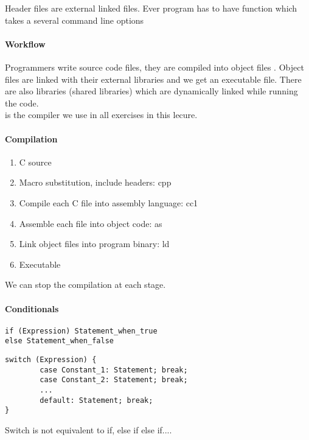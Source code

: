
Header files are external linked files. Ever program has to have  function which takes a several command line options 

\paragraph{Workflow}
Programmers write source code  files, they are compiled into object files . Object files are linked with their external libraries  and we get an executable file. There are also libraries (shared libraries) which are dynamically linked  while running the code.\\
 is the compiler we use in all exercises in this lecure.

\paragraph{Compilation}

\begin{enumerate}
    \item C source 
    \item Macro substitution, include headers: cpp 
    \item Compile each C file into assembly language: cc1 
    \item Assemble each file into object code: as 
    \item Link object files into program binary: ld
    \item Executable
\end{enumerate}
We can stop the compilation at each stage.

\paragraph{Conditionals}
\begin{lstlisting}
if (Expression) Statement_when_true
else Statement_when_false
\end{lstlisting}

\begin{lstlisting}
switch (Expression) {
        case Constant_1: Statement; break;
        case Constant_2: Statement; break;
        ...
        default: Statement; break;
}
\end{lstlisting}
Switch is not equivalent to if, else if else if....

